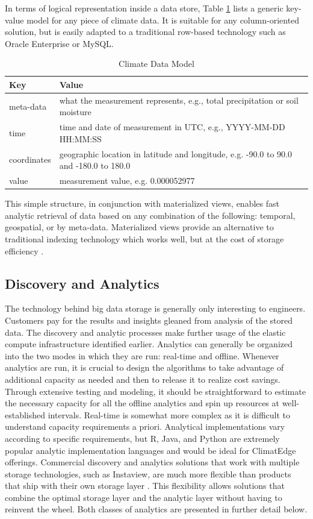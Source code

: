 In terms of logical representation inside a data store, Table \ref{model} lists a generic key-value model for any piece of climate data. It is suitable for any column-oriented solution, but is easily adapted to a traditional row-based technology such as Oracle Enterprise or MySQL.
\begin{table}[htbp]
    \centering
    \begin{tabular}{l l}
        \hline
	Key & Value \\ [0.5ex]
	\hline
	meta-data & what the measurement represents, e.g., total precipitation or soil moisture\\
	time & time and date of measurement in UTC, e.g., YYYY-MM-DD HH:MM:SS\\
	coordinates & geographic location in latitude and longitude, e.g. -90.0 to 90.0 and -180.0 to 180.0\\
	value & measurement value, e.g. 0.000052977\\
	\hline
    \end{tabular}
    \caption{Climate Data Model}
    \label{model}
\end{table}
This simple structure, in conjunction with materialized views, enables fast analytic retrieval of data based on any combination of the following: temporal, geospatial, or by meta-data. Materialized views provide an alternative to traditional indexing technology which works well, but at the cost of storage efficiency \cite{materialized_views}. 
\subsection{Discovery and Analytics}
The technology behind big data storage is generally only interesting to engineers. Customers pay for the results and insights gleaned from analysis of the stored data. The discovery and analytic processes make further usage of the elastic compute infrastructure identified earlier. Analytics can generally be organized into the two modes in which they are run: real-time and offline. Whenever analytics are run, it is crucial to design the algorithms to take advantage of additional capacity as needed and then to release it to realize cost savings. Through extensive testing and modeling, it should be straightforward to estimate the necessary capacity for all the offline analytics and spin up resources at well-established intervals. Real-time is somewhat more complex as it is difficult to understand capacity requirements a priori. Analytical implementations vary according to specific requirements, but R, Java, and Python are extremely popular analytic implementation languages and would be ideal for ClimatEdge offerings. Commercial discovery and analytics solutions that work with multiple storage technologies, such as Instaview, are much more flexible than products that ship with their own storage layer \cite{pentaho}. This flexibility allows solutions that combine the optimal storage layer and the analytic layer without having to reinvent the wheel. Both classes of analytics are presented in further detail below.
